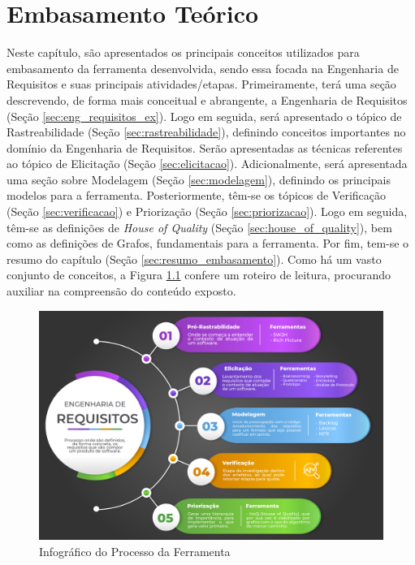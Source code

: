 \chapter[Embasamento Teórico]{Embasamento Teórico}

\label{chap:embasamento_teorico}

Neste capítulo, são apresentados os principais conceitos utilizados para embasamento da ferramenta desenvolvida, sendo essa focada na Engenharia de Requisitos e suas principais atividades/etapas. Primeiramente, terá uma seção descrevendo, de forma mais conceitual e abrangente, a Engenharia de Requisitos (Seção \ref{sec:eng_requisitos_ex}). Logo em seguida, será apresentado o tópico de Rastreabilidade (Seção \ref{sec:rastreabilidade}), definindo conceitos importantes no domínio da Engenharia de Requisitos. Serão apresentadas as técnicas referentes ao tópico de Elicitação (Seção \ref{sec:elicitacao}). Adicionalmente, será apresentada uma seção sobre Modelagem (Seção \ref{sec:modelagem}), definindo os principais modelos para a ferramenta. Posteriormente, têm-se os tópicos de Verificação (Seção \ref{sec:verificacao}) e Priorização (Seção \ref{sec:priorizacao}). Logo em seguida, têm-se as definições de \textit{House of Quality} (Seção \ref{sec:house_of_quality}), bem como as definições de Grafos, fundamentais para a ferramenta. Por fim, tem-se o resumo do capítulo (Seção \ref{sec:resumo_embasamento}). Como há um vasto conjunto de conceitos, a Figura \ref{fig:roadmap} confere um roteiro de leitura, procurando auxiliar na compreensão do conteúdo exposto.

\begin{figure}[]
    \begin{center}
        \caption{Infográfico do Processo da Ferramenta}
        \label{fig:roadmap}
        \includegraphics[scale=0.58]{figuras/Embasamento/infografico_engenharia_requisitos.png}
    \end{center}
\end{figure}

